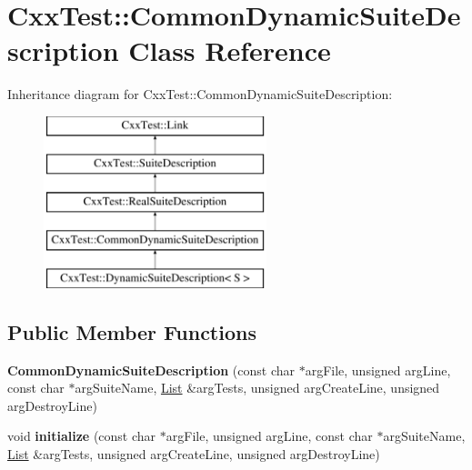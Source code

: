 \hypertarget{classCxxTest_1_1CommonDynamicSuiteDescription}{\section{Cxx\-Test\-:\-:Common\-Dynamic\-Suite\-Description Class Reference}
\label{classCxxTest_1_1CommonDynamicSuiteDescription}
}
Inheritance diagram for Cxx\-Test\-:\-:Common\-Dynamic\-Suite\-Description\-:\begin{figure}[H]
\begin{center}
\leavevmode
\includegraphics[height=5.000000cm]{classCxxTest_1_1CommonDynamicSuiteDescription}
\end{center}
\end{figure}
\subsection*{Public Member Functions}
\begin{DoxyCompactItemize}
\item 
\hypertarget{classCxxTest_1_1CommonDynamicSuiteDescription_a442dfefd08799d9ae046535d070f53fb}{{\bfseries Common\-Dynamic\-Suite\-Description} (const char $\ast$arg\-File, unsigned arg\-Line, const char $\ast$arg\-Suite\-Name, \hyperlink{structCxxTest_1_1List}{List} \&arg\-Tests, unsigned arg\-Create\-Line, unsigned arg\-Destroy\-Line)}\label{classCxxTest_1_1CommonDynamicSuiteDescription_a442dfefd08799d9ae046535d070f53fb}

\item 
\hypertarget{classCxxTest_1_1CommonDynamicSuiteDescription_a5a96dc7d24b2dfc45ebfc4e54eddc372}{void {\bfseries initialize} (const char $\ast$arg\-File, unsigned arg\-Line, const char $\ast$arg\-Suite\-Name, \hyperlink{structCxxTest_1_1List}{List} \&arg\-Tests, unsigned arg\-Create\-Line, unsigned arg\-Destroy\-Line)}\label{classCxxTest_1_1CommonDynamicSuiteDescription_a5a96dc7d24b2dfc45ebfc4e54eddc372}

\end{DoxyCompactItemize}
